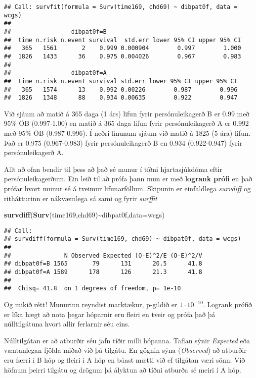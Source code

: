\documentclass[
]{book}
\newenvironment{Shaded}{\begin{snugshade}}{\end{snugshade}}
\newcommand{\DataTypeTok}[1]{\textcolor[rgb]{0.13,0.29,0.53}{#1}}
\newcommand{\KeywordTok}[1]{\textcolor[rgb]{0.13,0.29,0.53}{\textbf{#1}}}
\newcommand{\NormalTok}[1]{#1}
\newcommand{\OperatorTok}[1]{\textcolor[rgb]{0.81,0.36,0.00}{\textbf{#1}}}
\begin{document}
\begin{verbatim}
## Call: survfit(formula = Surv(time169, chd69) ~ dibpat0f, data = wcgs)
## 
##                 dibpat0f=B 
##  time n.risk n.event survival  std.err lower 95% CI upper 95% CI
##   365   1561       2    0.999 0.000904        0.997        1.000
##  1826   1433      36    0.975 0.004026        0.967        0.983
## 
##                 dibpat0f=A 
##  time n.risk n.event survival std.err lower 95% CI upper 95% CI
##   365   1574      13    0.992 0.00226        0.987        0.996
##  1826   1348      88    0.934 0.00635        0.922        0.947
\end{verbatim}

Við sjáum að matið á 365 daga (1 árs) lifun fyrir persónuleikagerð B er 0.99 með 95\% ÖB (0.997-1.00) en matið á 365 daga lifun fyrir persónuleikagerð A er 0.992 með 95\% ÖB (0.987-0.996). Í neðri línunum sjáum við matið á 1825 (5 ára) lifun. Það er 0.975 (0.967-0.983) fyrir persónuleikagerð B en 0.934 (0.922-0.947) fyrir persónuleikagerð A.

Allt að ofan bendir til þess að það sé munur í tíðni hjartasjúkdóma eftir persónuleikagerðum. Ein leið til að prófa þann mun er með \textbf{logrank prófi} en það prófar hvort munur sé á tveimur lifunarföllum. Skipunin er einfaldlega \emph{survdiff} og rithátturinn er nákvæmlega sá sami og fyrir \emph{surffit}

\begin{Shaded}
\begin{Highlighting}[]
\KeywordTok{survdiff}\NormalTok{(}\KeywordTok{Surv}\NormalTok{(time169,chd69)}\OperatorTok{\textasciitilde{}}\NormalTok{dibpat0f,}\DataTypeTok{data=}\NormalTok{wcgs)}
\end{Highlighting}
\end{Shaded}

\begin{verbatim}
## Call:
## survdiff(formula = Surv(time169, chd69) ~ dibpat0f, data = wcgs)
## 
##               N Observed Expected (O-E)^2/E (O-E)^2/V
## dibpat0f=B 1565       79      131      20.5      41.8
## dibpat0f=A 1589      178      126      21.3      41.8
## 
##  Chisq= 41.8  on 1 degrees of freedom, p= 1e-10
\end{verbatim}

Og mikið rétt! Munurinn reyndist marktækur, p-gildið er \(1 \cdot 10^{-10}\). Logrank prófið er líka hægt að nota þegar hóparnir eru fleiri en tveir og prófa það þá núlltilgátuna hvort allir ferlarnir séu eins.

Núlltilgátan er að atburðir séu jafn tíðir milli hópanna. Taflan sýnir \emph{Expected} eða væntanlegan fjölda miðað við þá tilgátu. En gögnin sýna (\emph{Observed}) að atburðir eru færri í B hóp og fleiri í A hóp en búast mætti við ef tilgátan væri sönn. Við höfnum þeirri tilgátu og drögum þá ályktun að tíðni atburða sé meiri í A hóp.
\end{document}
